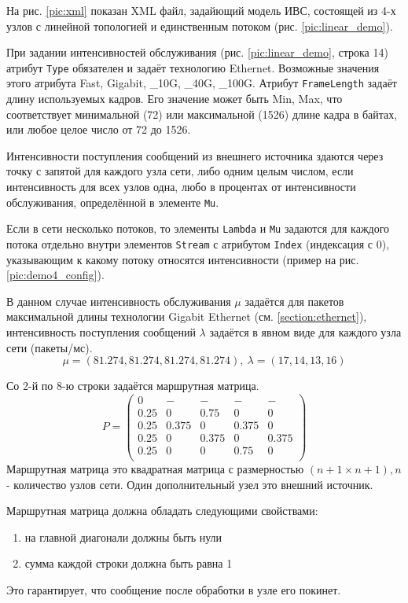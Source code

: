 \documentclass[oneside, final, 14pt, a4paper]{extreport}
\begin{document}
На рис. \ref{pic:xml} показан XML файл, задайющий модель ИВС, состоящей из 4-х узлов с линейной топологией и единственным потоком (рис. \ref{pic:linear_demo}).

При задании интенсивностей обслуживания (рис. \ref{pic:linear_demo}, строка 14) атрибут \verb:Type: обязателен и задаёт технологию Ethernet. Возможные значения этого атрибута Fast, Gigabit, \_10G, \_40G, \_100G. Атрибут \verb:FrameLength: задаёт длину используемых кадров. Его значение может быть  Min, Max, что соответствует минимальной (72) или максимальной (1526) длине кадра в байтах, или любое целое число от 72 до 1526.

Интенсивности поступления сообщений из внешнего источника здаются через точку с запятой для каждого узла сети, либо одним целым числом, если интенсивность для всех узлов одна, любо в процентах от интенсивности обслуживания, определённой в элементе \verb:Mu:.

Если в сети несколько потоков, то элементы \verb:Lambda: и \verb:Mu: задаются для каждого потока отдельно внутри элементов \verb:Stream: с атрибутом \verb:Index: (индексация с 0), указывающим к какому потоку относятся интенсивности (пример на рис. \ref{pic:demo4_config}).

В данном случае интенсивность обслуживания \( \mu \)  задаётся для пакетов максимальной длины технологии Gigabit Ethernet (см. \ref{section:ethernet}), интенсивность поступления сообщений \( \lambda \) задаётся в явном виде для каждого узла сети (пакеты/мс).
\[ \mu = (81.274, 81.274, 81.274, 81.274), \: \lambda = (17, 14, 13, 16) \]

Со 2-й по 8-ю строки задаётся маршрутная матрица.
\[ P = \left(\begin{matrix}
                0 & - & - & - & - \\
                0.25 & 0 & 0.75 & 0 & 0 \\
                0.25 & 0.375 & 0 & 0.375 & 0 \\
                0.25 & 0 & 0.375 & 0 & 0.375 \\
                0.25 & 0 & 0 & 0.75 & 0 \\
            \end{matrix}\right) \]
Маршрутная матрица это квадратная матрица с размерностью \( (n + 1 \times n + 1), n \) - количество узлов сети. Один дополнительный узел это внешний источник.

\noindent Маршрутная матрица должна обладать следующими свойствами:
\begin{enumerate}
	\item на главной диагонали должны быть нули
	\item сумма каждой строки должна быть равна 1
\end{enumerate}
Это гарантирует, что сообщение после обработки в узле его покинет.
\end{document}

